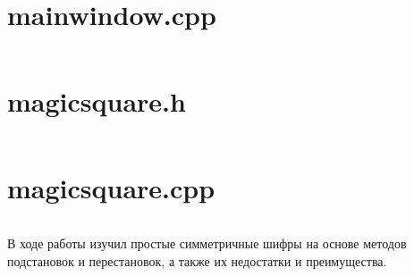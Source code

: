 \documentclass[utf8x, 14pt, bold, times]{G7-32} %
\begin{document}
\inputminted[fontsize=\footnotesize, breaklines]{cpp}{../../src/mainwindow.h}

\section{mainwindow.cpp}

\inputminted[fontsize=\footnotesize, breaklines]{cpp}{../../src/mainwindow.cpp}

\section{magicsquare.h}

\inputminted[fontsize=\footnotesize, breaklines]{cpp}{../../src/magicsquare.h}

\section{magicsquare.cpp}

\inputminted[fontsize=\footnotesize, breaklines]{cpp}{../../src/magicsquare.cpp}

\backmatter %

\newpage
\Conclusion

В ходе работы изучил простые симметричные шифры на основе методов подстановок
и перестановок, а также их недостатки и преимущества. 
\end{document}

